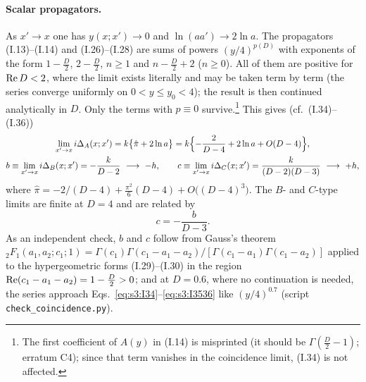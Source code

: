 \documentclass[aps,prd,onecolumn,10pt,nofootinbib,floatfix]{revtex4-2}
\newcommand{\eqI}[1]{(I.#1)}
\newcommand{\pihat}{\hat\pi}
\begin{document}
\paragraph*{Scalar propagators.}
As $x'\to x$ one has $y(x;x')\to0$ and $\ln(aa')\to2\ln a$. The propagators \eqI{13}--\eqI{14}
and \eqI{26}--\eqI{28} are sums of powers $(y/4)^{p(D)}$ with exponents of the form
$1-\frac D2$, $2-\frac D2$, $n\ge1$ and $n-\frac D2+2$ ($n\ge0$). All of them are positive for
${\rm Re}\,D<2$, where the limit exists literally and may be taken term by term (the series
converge uniformly on $0<y\le y_0<4$); the result is then continued analytically in $D$. Only
the terms with $p\equiv0$ survive.\footnote{The first coefficient of $A(y)$ in \eqI{14} is
misprinted (it should be $\Gamma(\frac D2-1)$; erratum C4); since that term vanishes in the coincidence
limit, \eqI{34} is not affected.} This gives (cf.\ \eqI{34}--\eqI{36})
\begin{gather}
\lim_{x'\to x}i\Delta_A(x;x')=k\bigl\{\pihat+2\ln a\bigr\}
=k\Bigl\{-\frac{2}{D-4}+2\ln a+O(D-4)\Bigr\},\label{eq:s3:I34}\\
b\equiv\lim_{x'\to x}i\Delta_B(x;x')=-\frac{k}{D-2}\ \longrightarrow\ -h,\qquad
c\equiv\lim_{x'\to x}i\Delta_C(x;x')=\frac{k}{(D-2)(D-3)}\ \longrightarrow\ +h,\label{eq:s3:I3536}
\end{gather}
where $\pihat=-2/(D-4)+\frac{\pi^2}{6}(D-4)+O\bigl((D-4)^3\bigr)$. The $B$- and $C$-type limits are
finite at $D=4$ and are related by
\begin{equation}\label{eq:s3:cb}
c=-\frac{b}{D-3}.
\end{equation}
As an independent check, $b$ and $c$ follow from Gauss's theorem
${}_2F_1(a_1,a_2;c_1;1)=\Gamma(c_1)\Gamma(c_1-a_1-a_2)/[\Gamma(c_1-a_1)\Gamma(c_1-a_2)]$ applied to
the hypergeometric forms \eqI{29}--\eqI{30} in the region ${\rm Re}(c_1-a_1-a_2)=1-\frac D2>0$;
and at $D=0.6$, where no
continuation is needed, the series approach Eqs.~\eqref{eq:s3:I34}--\eqref{eq:s3:I3536} like
$(y/4)^{0.7}$ (script \mbox{\nolinkurl{check_coincidence.py}}).
\end{document}
